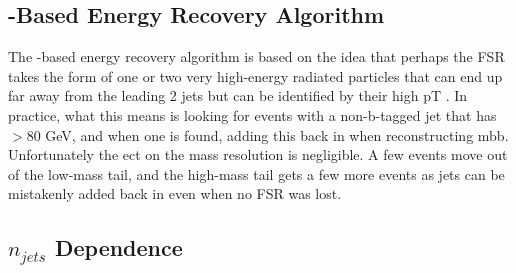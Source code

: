 \subsection{\pt-Based Energy Recovery Algorithm}
The \pt-based energy recovery algorithm is based on the idea that perhaps the FSR takes the form of one
 or two very high-energy radiated particles that can end up far away from the leading 2 jets but can be
 identified by their high pT . In practice, what this means is looking for events with a non-b-tagged jet that
 has \pt$>$80 GeV, and when one is found, adding this back in when reconstructing mbb.
 Unfortunately the ect on the mass resolution is negligible. A few events move out of the low-mass
 tail, and the high-mass tail gets a few more events as jets can be mistakenly added back in even when no
 FSR was lost.

\subsection{$n_{jets}$ Dependence} 
\label{sec:n_jets_sig}

